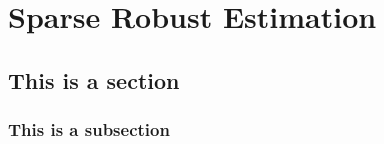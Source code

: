\chapter{Sparse Robust Estimation}

\section{This is a section}

\subsection{This is a subsection}











